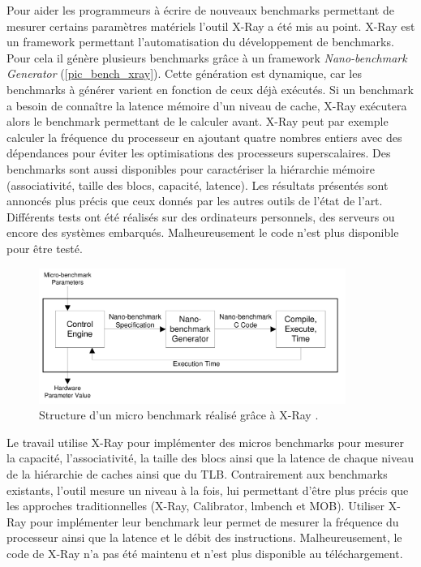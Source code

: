            Pour aider les programmeurs à écrire de nouveaux benchmarks permettant de mesurer certains paramètres matériels l'outil X-Ray a été mis au point. X-Ray est un \gls{framework} permettant l'automatisation du développement de benchmarks. Pour cela il génère plusieurs benchmarks grâce à un framework \textit{Nano-benchmark Generator} (\autoref{pic_bench_xray}). Cette génération est dynamique, car les benchmarks à générer varient en fonction de ceux déjà exécutés. Si un benchmark a besoin de connaître la latence mémoire d'un niveau de cache, X-Ray exécutera alors le benchmark permettant de le calculer avant. X-Ray peut par exemple calculer la fréquence du processeur en ajoutant quatre nombres entiers avec des dépendances pour éviter les optimisations des processeurs superscalaires. Des benchmarks sont aussi disponibles pour caractériser la hiérarchie mémoire (associativité, taille des blocs, capacité, latence). Les résultats présentés sont annoncés plus précis que ceux donnés par les autres outils de l'état de l'art. Différents tests ont été réalisés sur des ordinateurs personnels, des serveurs ou encore des systèmes embarqués. Malheureusement le code n'est plus disponible pour être testé. 
            
            \begin{figure}
                \center
                \includegraphics[width=10cm]{images/bench_xray.png}
                \caption{ Structure d'un micro benchmark réalisé grâce à X-Ray  \cite{Yotov2004}.
                \label{pic_bench_xray}}
            \end{figure}
            
             Le travail \cite{Yotov2005} utilise X-Ray pour implémenter des micros benchmarks pour mesurer la capacité, l'associativité, la taille des blocs ainsi que la latence de chaque niveau de la hiérarchie de caches ainsi que du TLB. Contrairement aux benchmarks existants, l'outil mesure un niveau à la fois, lui permettant d'être plus précis que les approches traditionnelles (X-Ray, Calibrator, lmbench et MOB). Utiliser X-Ray pour implémenter leur benchmark leur permet de mesurer la fréquence du processeur ainsi que la latence et le débit des instructions. Malheureusement, le code de X-Ray n'a pas été maintenu et n'est plus disponible au téléchargement.
        
